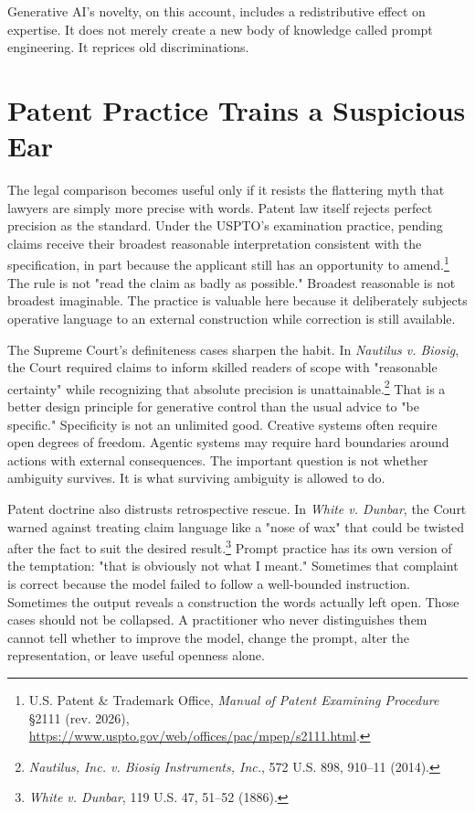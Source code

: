 \documentclass[11pt]{article}
\begin{document}
Generative AI's novelty, on this account, includes a redistributive effect on expertise. It does not merely create a new body of knowledge called prompt engineering. It reprices old discriminations.

\section{Patent Practice Trains a Suspicious Ear}

The legal comparison becomes useful only if it resists the flattering myth that lawyers are simply more precise with words. Patent law itself rejects perfect precision as the standard. Under the USPTO's examination practice, pending claims receive their broadest reasonable interpretation consistent with the specification, in part because the applicant still has an opportunity to amend.\footnote{U.S. Patent \& Trademark Office, \textit{Manual of Patent Examining Procedure} \S 2111 (rev. 2026), \url{https://www.uspto.gov/web/offices/pac/mpep/s2111.html}.} The rule is not "read the claim as badly as possible." Broadest reasonable is not broadest imaginable. The practice is valuable here because it deliberately subjects operative language to an external construction while correction is still available.

The Supreme Court's definiteness cases sharpen the habit. In \textit{Nautilus v. Biosig}, the Court required claims to inform skilled readers of scope with "reasonable certainty" while recognizing that absolute precision is unattainable.\footnote{\textit{Nautilus, Inc. v. Biosig Instruments, Inc.}, 572 U.S. 898, 910--11 (2014).} That is a better design principle for generative control than the usual advice to "be specific." Specificity is not an unlimited good. Creative systems often require open degrees of freedom. Agentic systems may require hard boundaries around actions with external consequences. The important question is not whether ambiguity survives. It is what surviving ambiguity is allowed to do.

Patent doctrine also distrusts retrospective rescue. In \textit{White v. Dunbar}, the Court warned against treating claim language like a "nose of wax" that could be twisted after the fact to suit the desired result.\footnote{\textit{White v. Dunbar}, 119 U.S. 47, 51--52 (1886).} Prompt practice has its own version of the temptation: "that is obviously not what I meant." Sometimes that complaint is correct because the model failed to follow a well-bounded instruction. Sometimes the output reveals a construction the words actually left open. Those cases should not be collapsed. A practitioner who never distinguishes them cannot tell whether to improve the model, change the prompt, alter the representation, or leave useful openness alone.
\end{document}
